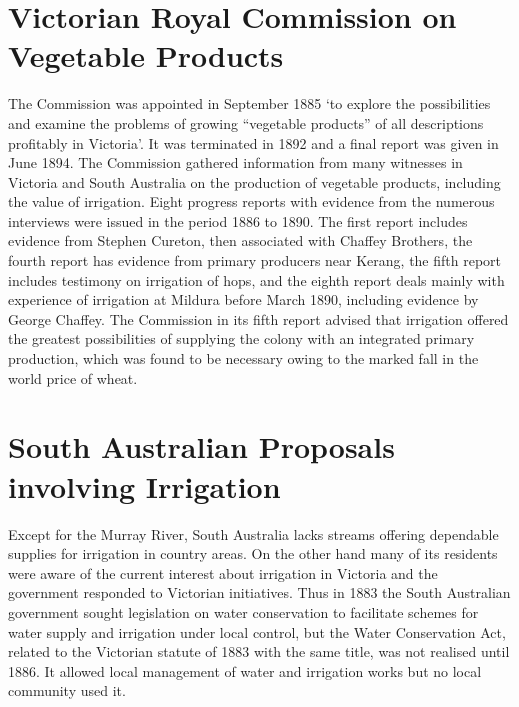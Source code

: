 \section*{Victorian Royal Commission on Vegetable Products}

The Commission was appointed in September 1885 `to explore the
possibilities and examine the problems of growing ``vegetable
products'' of all descriptions profitably in Victoria'.  It was
terminated in 1892 and a final report was given in June
1894.  The
Commission gathered information from many witnesses in Victoria and
South Australia on the production of vegetable products, including the
value of irrigation.  Eight progress reports with evidence from the
numerous interviews were issued in the period 1886 to 1890.  The first
report includes evidence from Stephen Cureton, then associated with
Chaffey Brothers, the fourth report has evidence from primary
producers near Kerang, the fifth report includes testimony on
irrigation of hops, and the eighth report deals mainly with experience
of irrigation at Mildura before March 1890, including evidence by
George Chaffey.  The Commission in its fifth report advised that
irrigation offered the greatest possibilities of supplying the colony
with an integrated primary production, which was found to be necessary
owing to the marked fall in the world price of
wheat.

\section*{South Australian Proposals involving Irrigation}

Except for the Murray River, South Australia lacks streams offering
dependable supplies for irrigation in country areas.  On the other
hand many of its residents were aware of the current interest about
irrigation in Victoria and the government responded to Victorian
initiatives.  Thus in 1883 the South Australian government sought
legislation on water conservation to facilitate schemes for water
supply and irrigation under local control, but the Water Conservation
Act, related to the Victorian statute of 1883 with the same title, was
not realised until 1886.  It allowed local management of water and
irrigation works but no local community used it.

